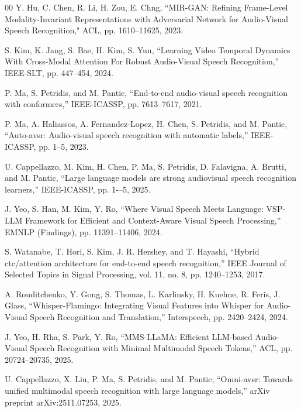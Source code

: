 \documentclass[conference]{IEEEtran}
\begin{document}
\begin{thebibliography}{00}
Y. Hu, C. Chen, R. Li, H. Zou, E. Chng, ``MIR-GAN: Refining Frame-Level Modality-Invariant Representations with Adversarial Network for Audio-Visual Speech Recognition," ACL, pp. 1610--11625, 2023.

S. Kim, K. Jang, S. Bae, H. Kim, S. Yun, ``Learning Video Temporal Dynamics With Cross-Modal Attention For Robust Audio-Visual Speech Recognition,'' IEEE-SLT, pp. 447--454, 2024.

P. Ma, S. Petridis, and M. Pantic, ``End-to-end audio-visual speech recognition with conformers,'' IEEE-ICASSP, pp. 7613--7617, 2021.

P. Ma, A. Haliassos, A. Fernandez-Lopez, H. Chen, S. Petridis, and M. Pantic, ``Auto-avsr: Audio-visual speech recognition with automatic labels,'' IEEE-ICASSP, pp. 1--5, 2023.

U. Cappellazzo, M. Kim, H. Chen, P. Ma, S. Petridis, D. Falavigna, A. Brutti, and M. Pantic, ``Large language models are strong audiovisual speech recognition learners,'' IEEE-ICASSP, pp. 1-–5, 2025.	
	
J. Yeo, S. Han, M. Kim, Y. Ro, ``Where Visual Speech Meets Language: VSP-LLM Framework for Efficient and Context-Aware Visual Speech Processing,'' EMNLP (Findings), pp. 11391--11406, 2024.

S. Watanabe, T. Hori, S. Kim, J. R. Hershey, and T. Hayashi, ``Hybrid ctc/attention architecture for end-to-end speech recognition,'' IEEE Journal of Selected Topics in Signal Processing, vol. 11, no. 8, pp. 1240--1253, 2017.	
	
A. Rouditchenko, Y. Gong, S. Thomas, L. Karlinsky, H. Kuehne, R. Feris, J. Glass, ``Whisper-Flamingo: Integrating Visual Features into Whisper for Audio-Visual Speech Recognition and Translation,'' Interspeech, pp. 2420--2424, 2024.
	
J. Yeo, H. Rha, S. Park, Y. Ro, ``{MMS}-{LL}a{MA}: Efficient {LLM}-based Audio-Visual Speech Recognition with Minimal Multimodal Speech Tokens,'' ACL, pp. 20724--20735, 2025.	
	
U. Cappellazzo, X. Liu, P. Ma, S. Petridis, and M. Pantic, ``Omni-avsr: Towards unified multimodal speech recognition with large language models,'' arXiv preprint arXiv:2511.07253, 2025.


\end{thebibliography}
\end{document}
